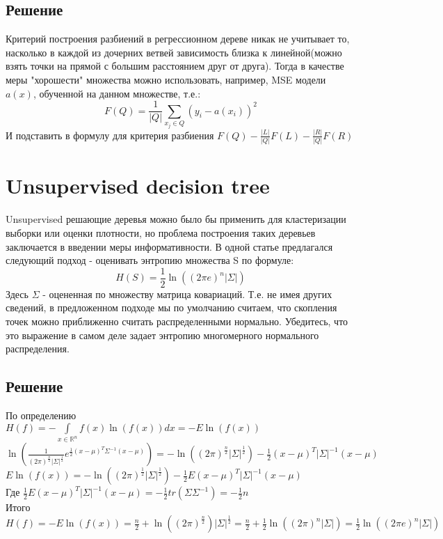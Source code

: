 \documentclass[11pt]{article}
\begin{document}
\subsection{Решение}
Критерий построения разбиений в регрессионном дереве никак не учитывает то, насколько в
каждой из дочерних ветвей зависимость близка к линейной(можно
взять точки на прямой с большим расстоянием друг от друга). Тогда в качестве меры "хорошести"  множества можно использовать, например, MSE модели $a(x)$, обученной на данном множестве, т.е.:
\begin{displaymath}
F(Q) = \frac{1}{|Q|} \sum \limits _{x_j \in Q} {(y_i - a(x_i)) ^ 2}
\end{displaymath}
И подставить в формулу для критерия разбиения $F(Q) - \frac{|L|}{|Q|}F(L) - \frac{|R|}{|Q|}F(R)$


\section{Unsupervised decision tree}
Unsupervised решающие деревья можно было бы применить для кластеризации выборки или
оценки плотности, но проблема построения таких деревьев заключается в введении меры
информативности. В одной статье предлагался следующий подход - оценивать энтропию
множества S по формуле:
\begin{displaymath}
H(S) = \frac{1}{2}\ln{((2\pi e)^{n} |\Sigma|)}
\end{displaymath}
Здесь $\Sigma$ - оцененная по множеству матрица ковариаций. Т.е. не имея других сведений, в
предложенном подходе мы по умолчанию считаем, что скопления точек можно приближенно
считать распределенными нормально. Убедитесь, что это выражение в самом деле задает
энтропию многомерного нормального распределения.

\subsection{Решение}
По определению \\
$H(f) = -\int \limits_{x \in \mathbb{R}^n} f(x) \ln(f(x))dx = -{E}\ln(f(x)) $\\
$ \ln{(\frac{1}{(2\pi)^{\frac{n}{2}} |\Sigma|^{\frac{1}{2}} } e^{ \frac{1}{2} (x - \mu)^T \Sigma^{-1} (x-\mu) })} = -\ln{((2\pi)^{\frac{n}{2}} |\Sigma|^{\frac{1}{2}})} - \frac{1}{2} (x - \mu)^T |\Sigma|^{-1} (x - \mu)$\\
$E \ln{(f(x))} = -\ln{((2\pi)^{\frac{1}{2}} |\Sigma|^{\frac{1}{2}})} - \frac{1}{2} E (x-\mu)^T |\Sigma|^{-1} (x - \mu)$\\
Где $ \frac{1}{2} E (x-\mu)^T |\Sigma|^{-1} (x - \mu) =  -\frac{1}{2} tr(\Sigma \Sigma^{-1}) = -\frac{1}{2}n$\\
Итого
$ H(f) =  -E\ln {(f(x))}  = \frac{n}{2} + \ln{((2\pi)^{\frac{n}{2}})} |\Sigma|^{\frac{1}{2}} = \frac{n}{2} + \frac{1}{2} \ln {((2\pi)^n |\Sigma|)} = \frac{1}{2} \ln{((2\pi e)^n |\Sigma|)} $
\end{document}
